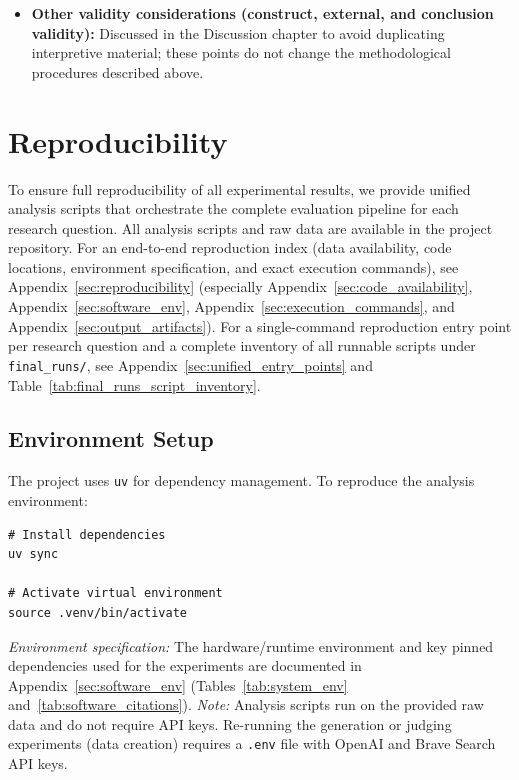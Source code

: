 \begin{itemize}[noitemsep]
    \item \textbf{Other validity considerations (construct, external, and conclusion validity):} Discussed in the Discussion chapter to avoid duplicating interpretive material; these points do not change the methodological procedures described above.
\end{itemize}

\section{Reproducibility}
\label{sec:reproduction}

To ensure full reproducibility of all experimental results, we provide unified analysis scripts that orchestrate the complete evaluation pipeline for each research question. All analysis scripts and raw data are available in the project repository.
For an end-to-end reproduction index (data availability, code locations, environment specification, and exact execution commands), see Appendix~\ref{sec:reproducibility} (especially Appendix~\ref{sec:code_availability}, Appendix~\ref{sec:software_env}, Appendix~\ref{sec:execution_commands}, and Appendix~\ref{sec:output_artifacts}).
For a single-command reproduction entry point per research question and a complete inventory of all runnable scripts under \texttt{final\_runs/}, see Appendix~\ref{sec:unified_entry_points} and Table~\ref{tab:final_runs_script_inventory}.

\subsection{Environment Setup}
The project uses \texttt{uv} for dependency management. To reproduce the analysis environment:
\begin{verbatim}
# Install dependencies
uv sync

# Activate virtual environment
source .venv/bin/activate
\end{verbatim}
\textit{Environment specification:} The hardware/runtime environment and key pinned dependencies used for the experiments are documented in Appendix~\ref{sec:software_env} (Tables~\ref{tab:system_env} and~\ref{tab:software_citations}).
\textit{Note:} Analysis scripts run on the provided raw data and do not require API keys. Re-running the generation or judging experiments (data creation) requires a \texttt{.env} file with OpenAI and Brave Search API keys.

